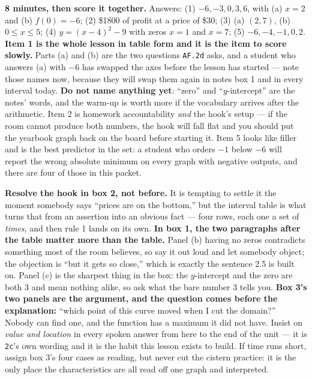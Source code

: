 \documentclass[10pt]{article}
\begin{document}
\boxguard[18]
\begin{teachernote}[Warm-Up]
    \textbf{8 minutes, then score it together.} Answers: (1) $-6, -3, 0, 3, 6$, with (a) $x=2$ and
    (b) $f(0)=-6$; (2) \$1800 of profit at a price of \$30; (3) (a) $(2,7)$, (b) $0 \le x \le 5$;
    (4) $y=(x-4)^2-9$ with zeros $x=1$ and $x=7$; (5) $-6, -4, -1, 0, 2$. \textbf{Item 1 is the whole
    lesson in table form and it is the item to score slowly.} Parts (a) and (b) are the two questions
    \texttt{AF.2d} asks, and a student who answers (a) with $-6$ has swapped the axes before the
    lesson has started --- note those names now, because they will swap them again in notes box 1 and
    in every interval today. \textbf{Do not name anything yet}: ``zero'' and ``$y$-intercept'' are the
    notes' words, and the warm-up is worth more if the vocabulary arrives after the arithmetic. Item 2
    is homework accountability \emph{and} the hook's setup --- if the room cannot produce both
    numbers, the hook will fall flat and you should put the yearbook graph back on the board before
    starting it. Item 5 looks like filler and is the best predictor in the set: a student who orders
    $-1$ below $-6$ will report the wrong absolute minimum on every graph with negative outputs, and
    there are four of those in this packet.
\end{teachernote}

\boxguard[18]
\begin{teachernote}
    \textbf{Resolve the hook in box 2, not before.} It is tempting to settle it the moment somebody
    says ``prices are on the bottom,'' but the interval table is what turns that from an assertion
    into an obvious fact --- four rows, each one a set of \emph{times}, and then rule 1 lands on its
    own. \textbf{In box 1, the two paragraphs after the table matter more than the table.} Panel (b)
    having no zeros contradicts something most of the room believes, so say it out loud and let
    somebody object; the objection is ``but it gets so close,'' which is exactly the sentence 2.5 is
    built on. Panel (c) is the sharpest thing in the box: the $y$-intercept and the zero are both $3$
    and mean nothing alike, so ask what the bare number $3$ tells you. \textbf{Box 3's two panels are
    the argument, and the question comes before the explanation:} ``which point of this curve moved
    when I cut the domain?'' Nobody can find one, and the function has a maximum it did not have.
    Insist on \emph{value and location} in every spoken answer from here to the end of the unit --- it
    is \texttt{2c}'s own wording and it is the habit this lesson exists to build. If time runs short,
    assign box 3's four cases as reading, but never cut the cistern practice: it is the only place the
    characteristics are all read off one graph and interpreted.
\end{teachernote}
\end{document}
